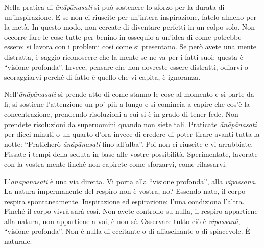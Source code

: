 Nella pratica di \textit{ānāpānasati} si può sostenere lo sforzo per la durata di
un'inspirazione. E se non ci riuscite per un'intera inspirazione, fatelo
almeno per la metà. In questo modo, non cercate di diventare perfetti in
un colpo solo. Non occorre fare le cose tutte per benino in ossequio a
un'idea di come potrebbe essere; si lavora con i problemi così come si
presentano. Se però avete una mente distratta, è saggio riconoscere che
la mente se ne va per i fatti suoi: questa è ``visione profonda''. Invece,
pensare che non dovreste essere distratti, odiarvi o scoraggiarvi perché
di fatto è quello che vi capita, è ignoranza.

Nell'\textit{ānāpānasati} si prende atto di come stanno le cose al momento e si
parte da lì; si sostiene l'attenzione un po' più a lungo e si comincia a
capire che cos'è la concentrazione, prendendo risoluzioni a cui si è in
grado di tener fede. Non prendete risoluzioni da superuomini quando non
siete tali. Praticate \textit{ānāpānasati} per dieci minuti o un quarto d'ora
invece di credere di poter tirare avanti tutta la notte: ``Praticherò
\textit{ānāpānasati} fino all'alba''. Poi non ci riuscite e vi arrabbiate. Fissate
i tempi della seduta in base alle vostre possibilità. Sperimentate,
lavorate con la vostra mente finché non capirete come sforzarvi, come
rilassarvi.

L'\textit{ānāpānasati} è una via diretta. Vi porta alla ``visione profonda'', alla
\textit{vipassanā}. La natura impermanente del respiro non è vostra, no? Essendo
nato, il corpo respira spontaneamente. Inspirazione ed espirazione:
l'una condiziona l'altra. Finché il corpo vivrà sarà così. Non avete
controllo su nulla, il respiro appartiene alla natura, non appartiene a
voi, è non-sé. Osservare tutto ciò è \textit{vipassanā}, ``visione profonda''. Non
è nulla di eccitante o di affascinante o di spiacevole. È naturale.

